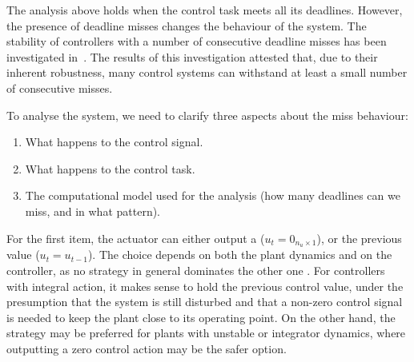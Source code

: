The analysis above holds when the control task meets all its deadlines.
However, the presence of deadline misses changes the behaviour of the system.
The stability of controllers with a number of consecutive deadline misses has been investigated in~\cite{Maggio:2020}.
The results of this investigation attested that, due to their inherent robustness, many control systems can withstand at least a small number of consecutive misses.

To analyse the system, we need to clarify three aspects about the miss behaviour:

\begin{enumerate}[label=(\roman*)]
    \item What happens to the control signal.
    \item What happens to the control task.
    \item The computational model used for the analysis (how many deadlines can we miss, and in what pattern).
\end{enumerate}

For the first item, the actuator can either output a \emph{\tZ{}} ($u_t = 0_{n_u \times 1}$), or \emph{\tH{}} the previous value ($u_t = u_{t-1}$).
The choice depends on both the plant dynamics and on the controller, as no strategy in general dominates the other one \cite{schenato09}.
For controllers with integral action, it makes sense to hold the previous control value, under the presumption that the system is still disturbed and that a non-zero control signal is needed to keep the plant close to its operating point.
On the other hand, the \tZ{} strategy may be preferred for plants with unstable or integrator dynamics, where outputting a zero control action may be the safer option.

